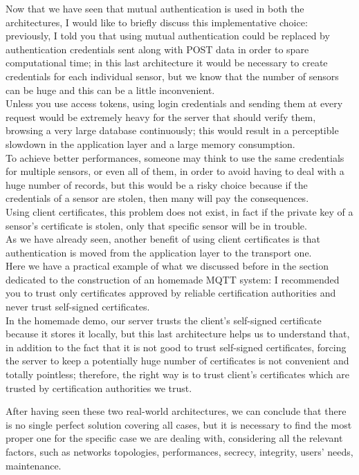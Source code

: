 \documentclass[12pt]{report}
\begin{document}
{{Now that we have seen that mutual authentication is used in both the architectures, I would like to briefly discuss this implementative choice: previously, I told you that using mutual authentication could be replaced by authentication credentials sent along with POST data in order to spare computational time; in this last architecture it would be necessary to create credentials for each individual sensor, but we know that the number of sensors can be huge and this can be a little inconvenient.\\
Unless you use access tokens, using login credentials and sending them at every request would be extremely heavy for the server that should verify them, browsing a very large database continuously; this would result in a perceptible slowdown in the application layer and a large memory consumption.\\
To achieve better performances, someone may think to use the same credentials for multiple sensors, or even all of them, in order to avoid having to deal with a huge number of records, but this would be a risky choice because if the credentials of a sensor are stolen, then many will pay the consequences.\\
Using client certificates, this problem does not exist, in fact if the private key of a sensor's certificate is stolen, only that specific sensor will be in trouble.\\
As we have already seen, another benefit of using client certificates is that authentication is moved from the application layer to the transport one.\\

Here we have a practical example of what we discussed before in the section dedicated to the construction of an homemade MQTT system: I recommended you to trust only certificates approved by reliable certification authorities and never trust self-signed certificates. \\
In the homemade demo, our server trusts the client's self-signed certificate because it stores it locally, but this last architecture helps us to understand that, in addition to the fact that it is not good to trust self-signed certificates, forcing the server to keep a potentially huge number of certificates is not convenient and totally pointless; therefore, the right way is to trust client's certificates which are trusted by certification authorities we trust.\\

\bigskip

After having seen these two real-world architectures, we can conclude that there is no single perfect solution covering all cases, but it is necessary to find the most proper one for the specific case we are dealing with, considering all the relevant factors, such as networks topologies, performances, secrecy, integrity, users' needs, maintenance.\\



}}
\end{document}
